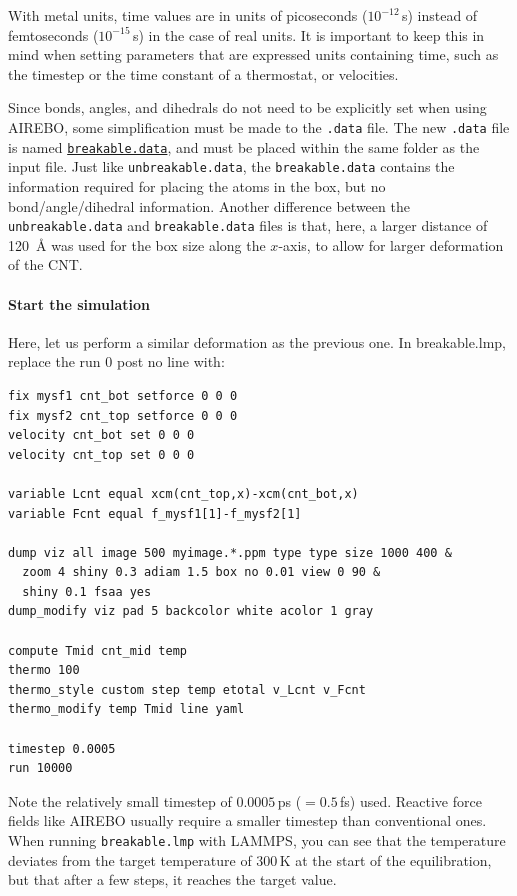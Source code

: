 \documentclass[9pt,tutorial]{livecoms}
\newcommand{\lmpcmd}[1]{\colorbox{listing}{\textcolor{command}{\small{#1}}}} %
\newcommand{\lmpcmdnote}[1]{\colorbox{note_listing}{\textcolor{command}{\small{#1}}}} %
\newcommand{\flecmd}[1]{\textcolor{command}{\texttt{#1}}} %
\newcommand{\dwlcmd}[1]{\textcolor{download}{\texttt{#1}}} %
\newcommand{\filepath}{https://raw.githubusercontent.com/lammpstutorials/lammpstutorials-article/main/files/}
\begin{document}
\begin{note}
  With \lmpcmdnote{metal} units, time values are in units of picoseconds
  ($10^{-12}$\,s) instead of femtoseconds ($10^{-15}$\,s) in the case of
  \lmpcmdnote{real} units.  It is important to keep this in mind when
  setting parameters that are expressed units containing time, such as
  the timestep or the time constant of a thermostat, or velocities.
\end{note}

Since bonds, angles, and dihedrals do not need to be explicitly set when
using AIREBO, some simplification must be made to the \flecmd{.data}
file.  The new \flecmd{.data} file is named
%
\href{\filepath tutorial2/breakable.data}{\dwlcmd{breakable.data}},
%
and must be placed within the same folder as the input file.  Just like
\flecmd{unbreakable.data}, the \flecmd{breakable.data} contains the
information required for placing the atoms in the box, but no
bond/angle/dihedral information.  Another difference between the
\flecmd{unbreakable.data} and \flecmd{breakable.data} files is that,
here, a larger distance of 120~Å was used for the box size along
the $x$-axis, to allow for larger deformation of the CNT.

\paragraph{Start the simulation}

Here, let us perform a similar deformation as the previous one.
In \lmpcmd{breakable.lmp}, replace the \lmpcmd{run 0 post no} line with:
\begin{lstlisting}
fix mysf1 cnt_bot setforce 0 0 0
fix mysf2 cnt_top setforce 0 0 0
velocity cnt_bot set 0 0 0
velocity cnt_top set 0 0 0

variable Lcnt equal xcm(cnt_top,x)-xcm(cnt_bot,x)
variable Fcnt equal f_mysf1[1]-f_mysf2[1]

dump viz all image 500 myimage.*.ppm type type size 1000 400 &
  zoom 4 shiny 0.3 adiam 1.5 box no 0.01 view 0 90 &
  shiny 0.1 fsaa yes
dump_modify viz pad 5 backcolor white acolor 1 gray

compute Tmid cnt_mid temp
thermo 100
thermo_style custom step temp etotal v_Lcnt v_Fcnt
thermo_modify temp Tmid line yaml

timestep 0.0005
run 10000
\end{lstlisting}
Note the relatively small timestep of $0.0005$\,ps ($= 0.5$\,fs) used.  Reactive force
fields like AIREBO usually require a smaller timestep than conventional ones.  When running
\flecmd{breakable.lmp} with LAMMPS, you can see that the temperature deviates
from the target temperature of $300\,\text{K}$ at the start of the equilibration,
but that after a few steps, it reaches the target value.
\end{document}

